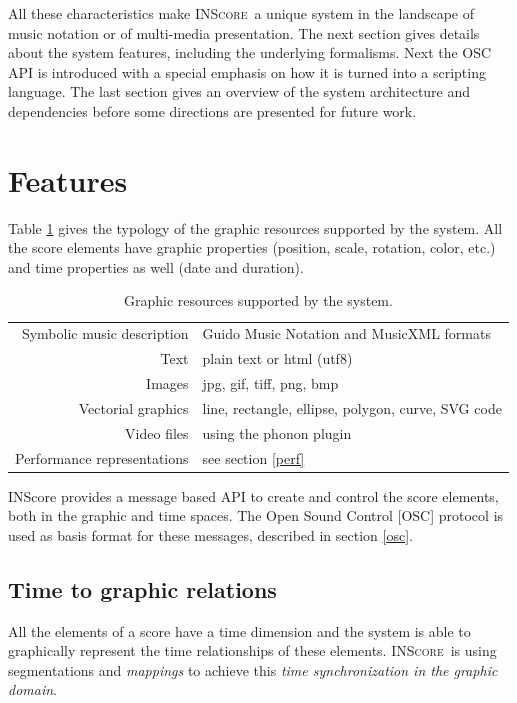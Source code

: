 \documentclass[11pt,letterpaper]{article}
\newcommand{\inscore}		{\textsc{\small INScore}}
\begin{document}
All these characteristics make \inscore\ a unique system in the landscape of music notation or of multi-media presentation. 
The next section gives details about the system features, including the underlying formalisms. Next the OSC API is introduced with a special emphasis on how it is turned into a scripting language. The last section gives an overview of the system architecture and dependencies before some directions are presented for future work.


\section{Features}

Table \ref{tblrsrc} gives the typology of the graphic resources supported by the system.
All the score elements have graphic properties (position, scale, rotation, color, etc.) and time properties as well (date and duration).

\begin{table}[htdp]
\begin{center}
\begin{tabular}{|r|l|}
\hline 
Symbolic music description 	& Guido Music Notation and MusicXML formats \\
Text 			& plain text or html (utf8)\\
Images 			& jpg, gif, tiff, png, bmp \\
Vectorial graphics	 	&  line, rectangle, ellipse, polygon, curve, SVG code \\
Video files	& using the phonon plugin \\
Performance representations & see section \ref{perf} \\
\hline
\end{tabular}
\end{center}
\caption{Graphic resources supported by the system.}
\label{tblrsrc}
\end{table}

INScore provides a message based API to create and control the score elements, both in the graphic and time spaces. The Open Sound Control [OSC] protocol is used as basis format for these messages, described in section \ref{osc}.

\subsection{Time to graphic relations}
\label{mappings}
All the elements of a score have a time dimension and the system is able to graphically represent the time relationships of these elements. \inscore\ is using segmentations and \emph{mappings} to achieve this \emph{time synchronization in the graphic domain}.
\end{document}
